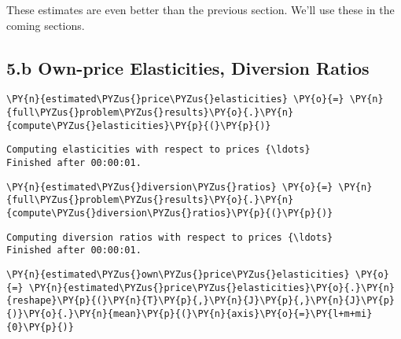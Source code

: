     These estimates are even better than the previous section. We'll use
these in the coming sections.

    \hypertarget{b-own-price-elasticities-diversion-ratios}{%
\subsection{5.b Own-price Elasticities, Diversion
Ratios}\label{b-own-price-elasticities-diversion-ratios}}

    \begin{tcolorbox}[breakable, size=fbox, boxrule=1pt, pad at break*=1mm,colback=cellbackground, colframe=cellborder]
\begin{Verbatim}[commandchars=\\\{\}]
\PY{n}{estimated\PYZus{}price\PYZus{}elasticities} \PY{o}{=} \PY{n}{full\PYZus{}problem\PYZus{}results}\PY{o}{.}\PY{n}{compute\PYZus{}elasticities}\PY{p}{(}\PY{p}{)}
\end{Verbatim}
\end{tcolorbox}

    \begin{Verbatim}[commandchars=\\\{\}]
Computing elasticities with respect to prices {\ldots}
Finished after 00:00:01.

    \end{Verbatim}

    \begin{tcolorbox}[breakable, size=fbox, boxrule=1pt, pad at break*=1mm,colback=cellbackground, colframe=cellborder]
\begin{Verbatim}[commandchars=\\\{\}]
\PY{n}{estimated\PYZus{}diversion\PYZus{}ratios} \PY{o}{=} \PY{n}{full\PYZus{}problem\PYZus{}results}\PY{o}{.}\PY{n}{compute\PYZus{}diversion\PYZus{}ratios}\PY{p}{(}\PY{p}{)}
\end{Verbatim}
\end{tcolorbox}

    \begin{Verbatim}[commandchars=\\\{\}]
Computing diversion ratios with respect to prices {\ldots}
Finished after 00:00:01.

    \end{Verbatim}

    \begin{tcolorbox}[breakable, size=fbox, boxrule=1pt, pad at break*=1mm,colback=cellbackground, colframe=cellborder]
\begin{Verbatim}[commandchars=\\\{\}]
\PY{n}{estimated\PYZus{}own\PYZus{}price\PYZus{}elasticities} \PY{o}{=} \PY{n}{estimated\PYZus{}price\PYZus{}elasticities}\PY{o}{.}\PY{n}{reshape}\PY{p}{(}\PY{n}{T}\PY{p}{,}\PY{n}{J}\PY{p}{,}\PY{n}{J}\PY{p}{)}\PY{o}{.}\PY{n}{mean}\PY{p}{(}\PY{n}{axis}\PY{o}{=}\PY{l+m+mi}{0}\PY{p}{)}
\end{Verbatim}
\end{tcolorbox}

